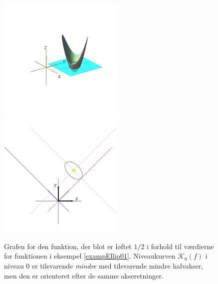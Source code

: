\begin{figure}[ht]
\centerline{  \includegraphics[height=60mm]{FIGS/plot2DNivEllipLift02.pdf} \includegraphics[height=60mm]{FIGS/plotEllipKvad02.pdf}}
\begin{center}
\caption{Grafen for den funktion, der blot er løftet $1/2$ i forhold til værdierne for funktionen i eksempel \ref{exampEllip01}. Niveaukurven $\mathcal{K}_{0}(f)$ i niveau $0$ er tilsvarende \emph{mindre} med tilsvarende mindre halvakser, men den er orienteret efter de samme akseretninger.} \label{figEllip02Kvad}
\end{center}
\end{figure}




